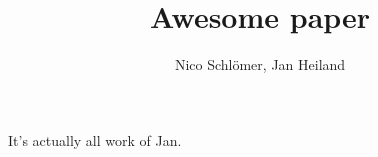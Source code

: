 \documentclass[a4paper,10pt]{article}
\title{Awesome paper}
\author{Nico Schlömer, Jan Heiland}
\begin{document}
It's actually all work of Jan.
\maketitle
\tableofcontents

\section{}



\end{document}
